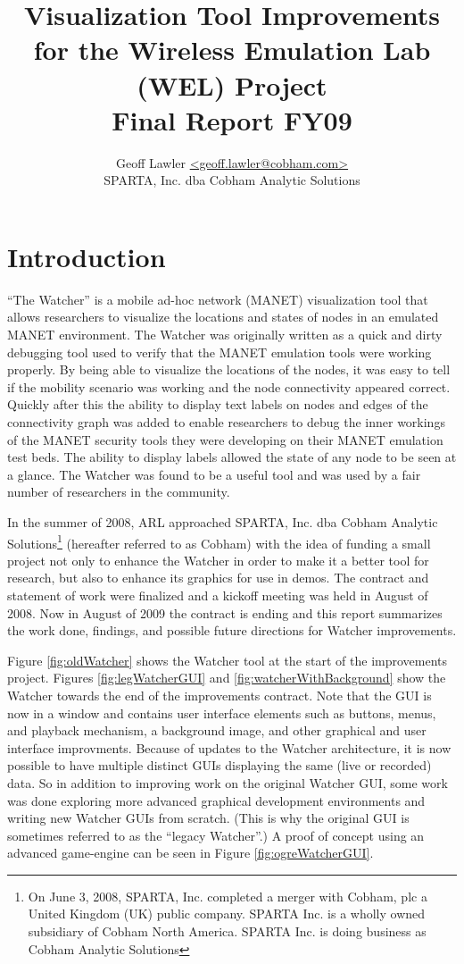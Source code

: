 \documentclass{report}
\author{Geoff Lawler \url{<geoff.lawler@cobham.com>} \\ SPARTA, Inc. dba Cobham Analytic Solutions}
\title{{\bf Visualization Tool Improvements for the Wireless Emulation Lab (WEL) Project}\\Final Report FY09}
\begin{document}
\maketitle

\renewcommand*\thesection{\arabic{section}}

\section{Introduction}

``The Watcher'' is a mobile ad-hoc network (MANET) visualization tool that allows researchers to visualize the locations and states of nodes in an emulated MANET environment. The Watcher was originally written 
as a quick and dirty debugging tool used to verify that the MANET emulation tools were working properly. By being able to visualize the locations of the nodes, it was easy to 
tell if the mobility scenario was working and the node connectivity appeared correct. Quickly after this the ability to display text labels on nodes and edges of the connectivity 
graph was added to enable researchers to debug the inner workings of the MANET security tools they were developing on their MANET emulation test beds. The ability to display labels
allowed the state of any node to be seen at a glance. The Watcher was found to be a useful tool and was used by a fair number of researchers in the community. 

In the summer of 2008, ARL approached SPARTA, Inc. dba Cobham Analytic Solutions\footnote{On June 3, 2008, SPARTA, Inc. completed a merger with Cobham, plc a United Kingdom (UK) 
public company. SPARTA Inc. is a wholly owned subsidiary of Cobham North America. SPARTA Inc. is doing business as Cobham Analytic Solutions}
(hereafter referred to as Cobham) with the idea of funding a small project not only to enhance the Watcher in order to make it a better tool for research, but also to enhance 
its graphics for use in demos. The contract and statement of work were finalized and a kickoff meeting was held in August of 2008. Now in August of 2009 the contract is ending and 
this report summarizes the work done, findings, and possible future directions for Watcher improvements. 

Figure \ref{fig:oldWatcher} shows the Watcher tool at the start of the improvements project. Figures \ref{fig:legWatcherGUI} and \ref{fig:watcherWithBackground}
show the Watcher towards the end of the improvements contract. Note that the GUI is now in a window and contains user interface elements such as buttons, menus, and playback
mechanism, a background image, and other graphical and user interface improvments. Because of updates to the Watcher architecture, it is now possible to have multiple distinct GUIs displaying the same (live or recorded) data. So in addition to improving
work on the original Watcher GUI, some work was done exploring more advanced graphical development environments and writing new Watcher GUIs from scratch. (This is why the original
GUI is sometimes referred to as the ``legacy Watcher''.) A proof of concept using an advanced game-engine can be seen in Figure \ref{fig:ogreWatcherGUI}. 
\end{document}
